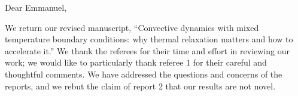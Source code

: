 \documentclass[aps, 11pt, singlecolumn]{revtex4-1} %
\begin{document}
\newenvironment{myquotation}{
\begin{quotation}
\itshape
}{ 
\end{quotation}
}
\noindent
Dear Emmanuel,
$\,$\newline

\begin{singlespace}
We return our revised manuscript, ``Convective dynamics with mixed temperature boundary conditions: why thermal relaxation matters and how to accelerate it.'' 
We thank the referees for their time and effort in reviewing our work; we would like to particularly thank referee 1 for their careful and thoughtful comments.
We have addressed the questions and concerns of the reports, and we rebut the claim of report 2 that our results are not novel.


\end{singlespace}
\end{document}
